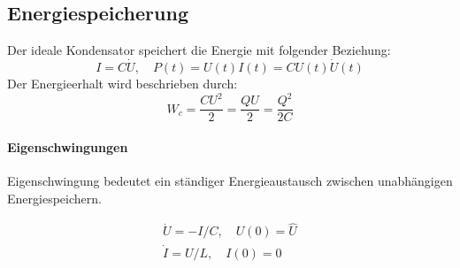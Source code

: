 \documentclass[12pt]{article}
\begin{document}
\subsection{Energiespeicherung }
Der ideale Kondensator speichert die Energie mit folgender Beziehung: 
\begin{equation}\label{key}
I = C\dot{U},\quad P(t) = U(t) I(t) = C U(t) \dot{U}(t)
\end{equation}
\noindent
Der Energieerhalt wird beschrieben durch: 
\begin{equation}\label{key}
W_c = \frac{CU^2}{2}=\frac{QU}{2}=\frac{Q^2}{2C}
\end{equation}

\paragraph{Eigenschwingungen}
Eigenschwingung bedeutet ein ständiger Energieaustausch zwischen unabhängigen Energiespeichern. 

\begin{align}
\dot{U}=-I/C, \quad  U(0) = \hat{U} \\
\dot{I}=U/L, \quad I(0) = 0 
\end{align}
\end{document}
